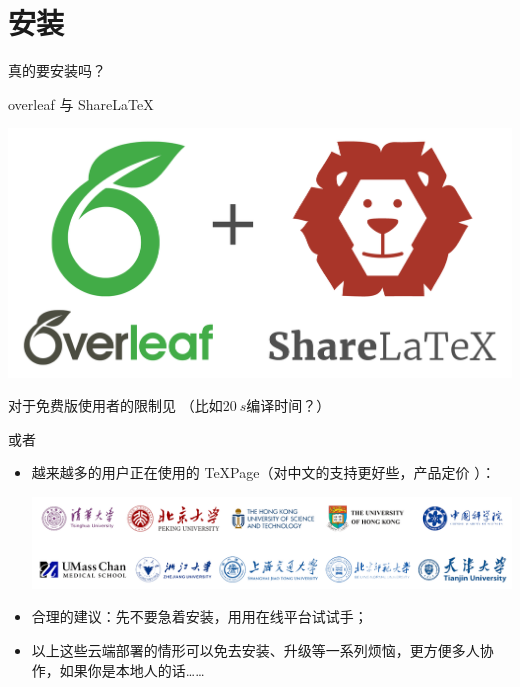 \section{安装}

\begin{frame}[standout]
	真的要安装吗？

	\textcolor[HTML]{42AC47}{overleaf} 与 \textcolor[HTML]{A93529}{ShareLaTeX}

	\includegraphics[width=.7\textwidth]{images/ol_plus_sl.png}

	\pause\small\mdseries 对于免费版使用者的限制见 （比如$\qty{20}{s}$编译时间？）
\end{frame}

\begin{frame}{或者}
	\begin{itemize}
		\item<+-> 越来越多的用户正在使用的 TeXPage（对中文的支持更好些，产品定价 ）：
			\begin{center}
				\includegraphics[width=.8\textwidth]{images/editor-users.png}
			\end{center}
		\item<+-> 合理的建议：先不要急着安装，用用在线平台试试手；
		\item<+-> 以上这些云端部署的情形可以免去安装、升级等一系列烦恼，更方便多人协作，如果你是本地人的话……
	\end{itemize}
\end{frame}

